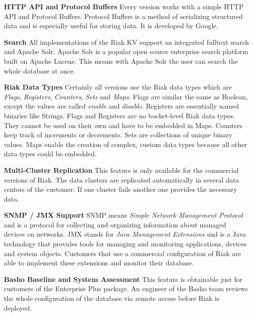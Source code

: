 \textbf{HTTP API and Protocol Buffers}\newline
Every version works with a simple HTTP API and Protocol Buffers. Protocol Buffers is a method of serializing structured data and is especially useful for storing data. It is developed by Google. \cite{GoogleDevelopers.06.04.2017}

\textbf{Search}\newline
All implementations of the Riak KV support an integrated fulltext search and Apache Solr. Apache Solr is a popular open source enterprise search platform  built on Apache Lucene. This means with Apache Solr the user can search the whole database at once. \cite{TheApacheSoftwareFoundation.06.04.2017}

\textbf{Riak Data Types}\newline
Certainly all versions use the Riak data types which are \textit{Flags}, \textit{Registers}, \textit{Counters}, \textit{Sets} and \textit{Maps}. Flags are similar the same as Boolean, except the values are called \textit{enable} and \textit{disable}. Registers are essentially named binaries like Strings. Flags and Registers are no bucket-level Riak data types. They cannot be used on their own and have to be embedded in Maps. Counters keep track of increments or decrements. Sets are collections of unique binary values. Maps enable the creation of complex, custom data types because all other data types could be embedded. \cite{Basho.06.04.2017}

\textbf{Multi-Cluster Replication}\newline
This feature is only available for the commercial versions of Riak. The data clusters are replicated automatically in several data centers of the customer. If one cluster fails another one provides the necessary data. \cite{Basho.01.04.2017}

\textbf{SNMP / JMX Support}\newline
SNMP means \textit{Simple Network Management Protocol} and is a protocol for collecting and organizing information about managed devices on networks. \cite{L8ManeValidus.06.04.2017} JMX stands for \textit{Java Management Extensions} and is a Java technology that provides tools for managing and monitoring applications, devices and system objects. \cite{Bryanssm.06.04.2017} Customers that use a commercial configuration of Riak are able to implement these extensions and monitor their database.

\newpage

\textbf{Basho Baseline and System Assessment}\newline
This feature is obtainable just for customers of the Enterprise Plus package. An engineer of the Basho team reviews the whole configuration of the database via remote access before Riak is deployed. \cite{Basho.01.04.2017}


